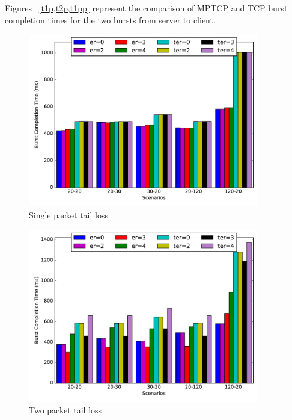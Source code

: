 \documentclass[12pt,draftcls,onecolumn]{IEEEtran}
\begin{document}
Figures ~\ref{t1p,t2p,t1pp} represent the comparison of MPTCP and TCP burst completion times for the two bursts from server to client.

\begin{figure}[!ht]
\begin{center}
\includegraphics[angle=0, width=0.9\textwidth,natwidth=578.16,natheight=433.62]{plots/T1P.pdf}
\caption{Single packet tail loss}\label{t1p}
\end{center}
\end{figure}



\begin{figure}[!ht]
\begin{center}
\includegraphics[angle=0, width=0.9\textwidth,natwidth=578.16,natheight=433.62]{plots/T2P.pdf}
\caption{Two packet tail loss}\label{t2p}
\end{center}
\end{figure}
\end{document}
